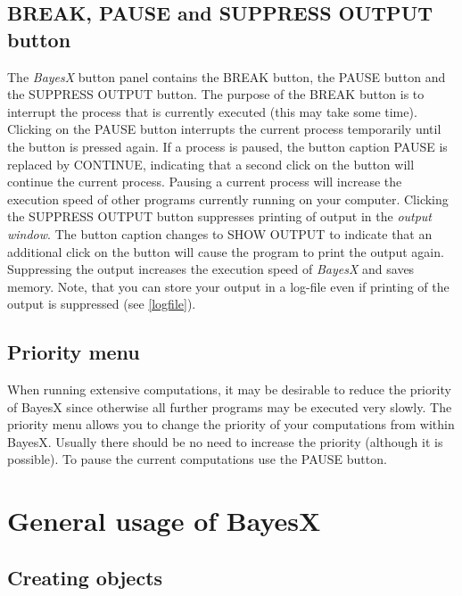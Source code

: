 \subsection{BREAK, PAUSE and SUPPRESS OUTPUT button}
\label{buttons}  
 
 

The {\em BayesX} button panel contains the BREAK button, the PAUSE
button and the SUPPRESS OUTPUT button. The purpose of the BREAK
button is to interrupt the process that is currently executed
(this may take some time). Clicking on the PAUSE button interrupts
the current process temporarily until the button is pressed again.
If a process is paused, the button caption PAUSE is replaced by
CONTINUE, indicating that a second click on the button will
continue the current process. Pausing a current process will
increase the execution speed of other programs currently running
on your computer. Clicking the SUPPRESS OUTPUT button suppresses
printing of output in the {\em output window}. The button caption
changes to SHOW OUTPUT to indicate that an additional click on the
button will cause the program to print the output again.
Suppressing the output increases the execution speed of {\em
BayesX} and saves memory. Note, that you can store your output in
a log-file even if printing of the output is suppressed (see
\autoref{logfile}).

\subsection{Priority menu}
\label{prioritymenu} 

When running extensive computations, it may be desirable to reduce
the priority of BayesX since otherwise all further programs may be
executed very slowly. The priority menu allows you to change the
priority of your computations from within BayesX. Usually there
should be no need to increase the priority (although it is
possible). To pause the current computations use the PAUSE button.

\section{General usage of BayesX}
\label{generalusage}

\subsection{Creating objects}
\label{createobject}  

